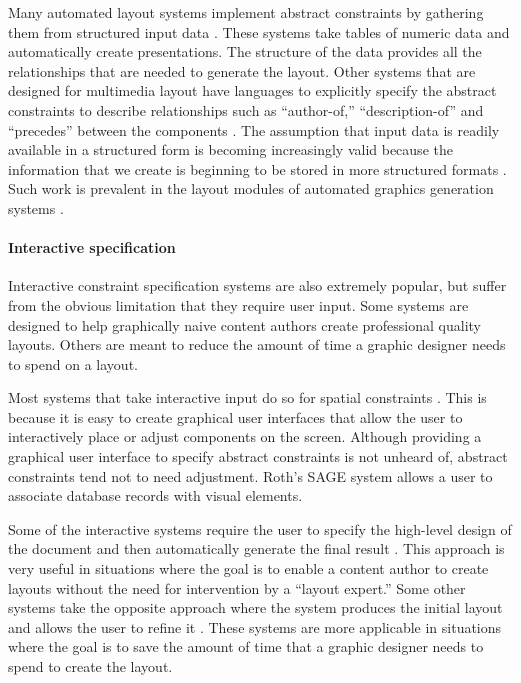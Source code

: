      Many automated layout systems implement abstract constraints by gathering
     them from structured input data
     \citep{mackinlay-1,casner-1,borning-1,beach-1}. These systems take tables
     of numeric data and automatically create presentations. The structure of
     the data provides all the relationships that are needed to generate the
     layout. Other systems that are designed for multimedia layout have
     languages to explicitly specify the abstract constraints to describe
     relationships such as “author-of,” “description-of” and “precedes” between
     the components \citep{weitzman-2,graf-1}. The assumption that input data is
     readily available in a structured form is becoming increasingly valid
     because the information that we create is beginning to be stored in more
     structured formats \citep{bray-1}. Such work is prevalent in the layout
     modules of automated graphics generation systems \citep{zhou-2}.

     \paragraph{Interactive specification}

      Interactive constraint specification systems are also extremely popular,
      but suffer from the obvious limitation that they require user input. Some
      systems are designed to help graphically naive content authors create
      professional quality layouts. Others are meant to reduce the amount of time
      a graphic designer needs to spend on a layout.

      Most systems that take interactive input do so for spatial constraints
      \citep{singh-2,hudson-2,borning-1}. This is because it is easy to create
      graphical user interfaces that allow the user to interactively place or
      adjust components on the screen. Although providing a graphical user
      interface to specify abstract constraints is not unheard of, abstract
      constraints tend not to need adjustment. Roth’s SAGE system \citep{roth-1}
      allows a user to associate database records with visual elements.

      Some of the interactive systems require the user to specify the high-level
      design of the document and then automatically generate the final result
      \citep{kim-1}. This approach is very useful in situations where the goal is
      to enable a content author to create layouts without the need for
      intervention by a “layout expert.” Some other systems take the opposite
      approach where the system produces the initial layout and allows the user
      to refine it \citep{singh-1}. These systems are more applicable in
      situations where the goal is to save the amount of time that a graphic
      designer needs to spend to create the layout.


